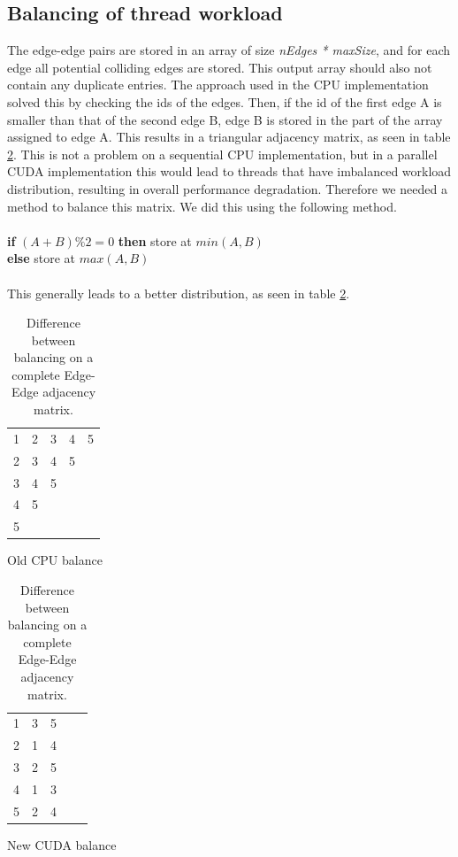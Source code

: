 \subsection{Balancing of thread workload}
The edge-edge pairs are stored in an array of size \textit{nEdges * maxSize}, and for each edge all potential colliding edges are stored. This output array should also not contain any duplicate entries. The approach used in the CPU implementation solved this by checking the ids of the edges. Then, if the id of the first edge A is smaller than that of the second edge B, edge B is stored in the part of the array assigned to edge A. This results in a triangular adjacency matrix, as seen in table \ref{table:balance}. This is not a problem on a sequential CPU implementation, but in a parallel CUDA implementation this would lead to threads that have imbalanced workload distribution, resulting in overall performance degradation. Therefore we needed a method to balance this matrix. We did this using the following method.\\
\\
\indent \indent \textbf{if} $(A + B) \% 2 = 0$ \textbf{then} store at $min(A,B)$\\
\indent \indent \textbf{else} store at $max(A,B)$ \\
\\
This generally leads to a better distribution, as seen in table \ref{table:balance}.

\begin{table}[!htb]
    	\begin{subtable}{.5\linewidth}
		\centering
		\begin{tabular}{ c || c | c | c | c }
			1 & 2 & 3 & 4 & 5 \\
			2 & 3 & 4 & 5 \\
			3 & 4 & 5 & \\
			4 & 5 & & \\
			5 & & &\\
		\end{tabular}
		\caption{Old CPU balance}
	\end{subtable}%
    	\begin{subtable}{.5\linewidth}
		\centering        
		\begin{tabular}{ c || c | c | c | c }
			1 & 3 & 5 &  &  \\
			2 & 1 & 4 &  &\\
			3 & 2 & 5 &  &\\
			4 & 1 & 3 &  &\\
			5 & 2 & 4 &  &\\
		\end{tabular}
		\caption{New CUDA balance}
	\end{subtable} 
	\caption{Difference between balancing on a complete Edge-Edge adjacency matrix.}
	\label{table:balance}
\end{table}

